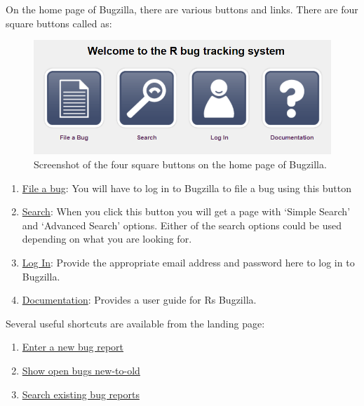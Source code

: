 \documentclass[
]{book}
\begin{document}
On the home page of Bugzilla, there are various buttons and links. There are four square buttons called as:

\begin{figure}
\centering
\includegraphics{img/squarebuttons.png}
\caption{Screenshot of the four square buttons on the home page of Bugzilla.}
\end{figure}

\begin{enumerate}
\def\labelenumi{\arabic{enumi}.}
\item
  \href{https://bugs.r-project.org/enter_bug.cgi}{File a bug}: You will have to log in to Bugzilla to file a bug using this button
\item
  \href{https://bugs.r-project.org/query.cgi}{Search}: When you click this button you will get a page with `Simple Search' and `Advanced Search' options. Either of the search options could be used depending on what you are looking for.
\item
  \href{https://bugs.r-project.org/?GoAheadAndLogIn=1}{Log In}: Provide the appropriate email address and password here to log in to Bugzilla.
\item
  \href{https://bugzilla.readthedocs.io/en/latest/using/index.html}{Documentation}: Provides a user guide for R\textquotesingle s Bugzilla.
\end{enumerate}

Several useful shortcuts are available from the landing page:

\begin{enumerate}
\def\labelenumi{\arabic{enumi}.}
\item
  \href{https://bugs.r-project.org/enter_bug.cgi}{Enter a new bug report}
\item
  \href{https://bugs.r-project.org/buglist.cgi?bug_file_loc_type=allwordssubstr\&bug_status=NEW\&bug_status=ASSIGNED\&bug_status=CONFIRMED\&bug_status=REOPENED\&bug_status=UNCONFIRMED\&bugidtype=include\&chfieldto=Now\&cmdtype=doit\&emailassigned_to1=1\&emailassigned_to2=1\&emailcc2=1\&emailreporter2=1\&emailtype1=substring\&emailtype2=substring\&field0-0-0=noop\&long_desc_type=substring\&order=bugs.delta_ts\%20desc\&query_format=advanced\&short_desc_type=allwordssubstr\&type0-0-0=noop}{Show open bugs new-to-old}
\item
  \href{https://bugs.r-project.org/query.cgi}{Search existing bug reports}
\end{enumerate}
\end{document}
